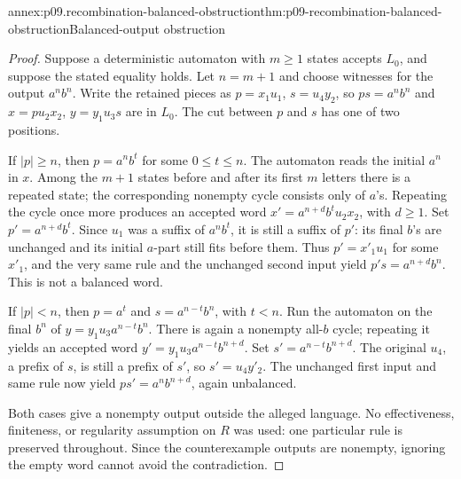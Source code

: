\begin{annexitem}{annex:p09.recombination-balanced-obstruction}{thm:p09-recombination-balanced-obstruction}{Balanced-output obstruction}
\begin{proof}
Suppose a deterministic automaton with \(m\geq1\) states accepts \(L_0\),
and suppose the stated equality holds. Let \(n=m+1\) and choose witnesses
for the output \(a^nb^n\). Write the retained pieces as
\(p=x_1u_1\), \(s=u_4y_2\), so \(ps=a^nb^n\) and
\(x=pu_2x_2\), \(y=y_1u_3s\) are in \(L_0\).
The cut between \(p\) and \(s\) has one of two positions.

If \(|p|\geq n\), then \(p=a^nb^t\) for some \(0\leq t\leq n\).
The automaton reads the initial \(a^n\) in \(x\). Among the \(m+1\)
states before and after its first \(m\) letters there is a repeated state;
the corresponding nonempty cycle consists only of \(a\)'s.
Repeating the cycle once more produces an accepted word
\(x'=a^{n+d}b^tu_2x_2\), with \(d\geq1\).
Set \(p'=a^{n+d}b^t\). Since \(u_1\) was a suffix of \(a^nb^t\),
it is still a suffix of \(p'\): its final \(b\)'s are unchanged and its
initial \(a\)-part still fits before them. Thus \(p'=x'_1u_1\) for
some \(x'_1\), and the very same rule and the unchanged second input
yield \(p's=a^{n+d}b^n\). This is not a balanced word.

If \(|p|<n\), then \(p=a^t\) and \(s=a^{n-t}b^n\), with \(t<n\).
Run the automaton on the final \(b^n\) of \(y=y_1u_3a^{n-t}b^n\).
There is again a nonempty all-\(b\) cycle; repeating it yields an
accepted word \(y'=y_1u_3a^{n-t}b^{n+d}\).
Set \(s'=a^{n-t}b^{n+d}\). The original \(u_4\), a prefix of \(s\),
is still a prefix of \(s'\), so \(s'=u_4y'_2\).
The unchanged first input and same rule now yield
\(ps'=a^nb^{n+d}\), again unbalanced.

Both cases give a nonempty output outside the alleged language.
No effectiveness, finiteness, or regularity assumption on \(R\) was used:
one particular rule is preserved throughout. Since the counterexample
outputs are nonempty, ignoring the empty word cannot avoid the contradiction.
\end{proof}
\end{annexitem}

